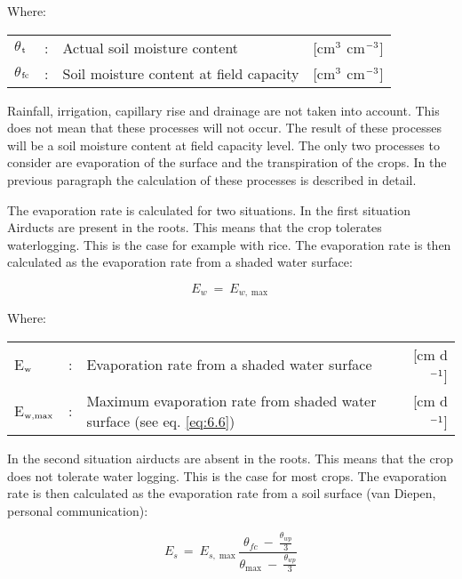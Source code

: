 Where:\\[5pt]
\begin{tabularx}{\textwidth}{llXr}
	$\theta$$_{{\rm t}}$ &:& Actual soil moisture content & [cm$^{{\rm 3}}$ cm$^{{\rm -3}}$]\\
	$\theta$$_{{\rm fc}}$ &:& Soil moisture content at field capacity & [cm$^{{\rm 3}}$ cm$^{{\rm -3}}$]\\
\end{tabularx}

Rainfall, irrigation, capillary rise and drainage are not taken into account. This does not
mean that these processes will not occur. The result of these processes will be a soil
moisture content at field capacity level. The only two processes to consider are evaporation of 
the surface and the transpiration of the crops. In the previous paragraph the
calculation of these processes is described in detail.

The evaporation rate is calculated for two situations. In the first situation
Airducts are present in the roots. This means that the crop tolerates waterlogging. This
is the case for example with rice. The evaporation rate is then calculated as the 
evaporation rate from a shaded water surface:

\begin{equation}
E _{w} ~=~ E _{w, \max } 
\end{equation}

Where:\\[5pt]
\begin{tabularx}{\textwidth}{llXr}
	E$_{{\rm w}}$ &:& Evaporation rate from a shaded water surface & [cm d$^{{\rm -1}}$]\\
	E$_{{\rm w,max}}$ &:& Maximum evaporation rate from shaded 
	water surface (see eq. \ref{eq:6.6}) & [cm d$^{{\rm -1}}$]\\
\end{tabularx}

In the second situation airducts are absent in the roots. This means that the crop does
not tolerate water
logging. This is the case for most crops. The evaporation rate is then calculated as the
evaporation rate from a soil surface (van Diepen, personal communication):  

\begin{equation}
\label{eq:6.17}
E _{s~} =~ E _{s,\max } {\frac{ \theta  _{fc} ~-~ {{\frac{\theta  _{wp} }{3}}} }{\theta  _{\max } ~-~{{\frac{\theta  _{wp} }{3}}} }}
\end{equation}

